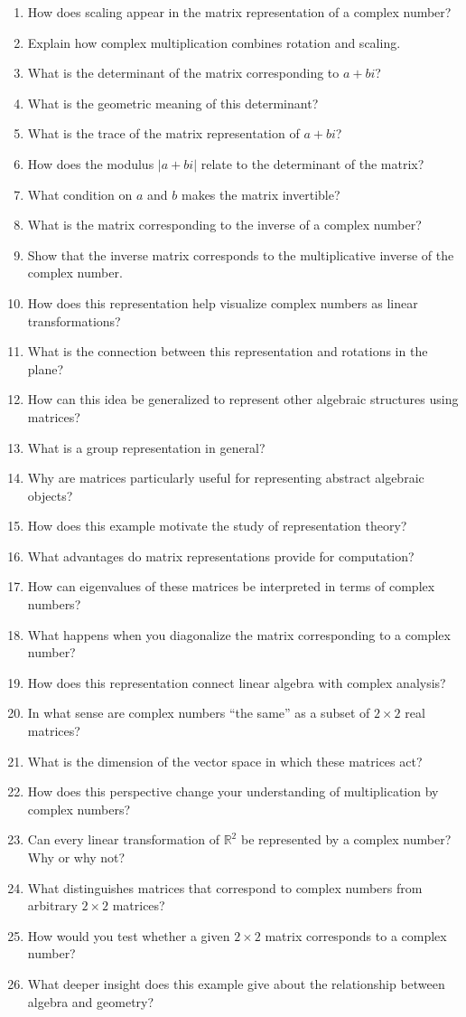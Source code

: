 \begin{enumerate}
  \item How does scaling appear in the matrix representation of a complex number?
  \item Explain how complex multiplication combines rotation and scaling.
  \item What is the determinant of the matrix corresponding to \(a + bi\)?
  \item What is the geometric meaning of this determinant?
  \item What is the trace of the matrix representation of \(a + bi\)?
  \item How does the modulus \(|a+bi|\) relate to the determinant of the matrix?
  \item What condition on \(a\) and \(b\) makes the matrix invertible?
  \item What is the matrix corresponding to the inverse of a complex number?
  \item Show that the inverse matrix corresponds to the multiplicative inverse of the complex number.
  \item How does this representation help visualize complex numbers as linear transformations?
  \item What is the connection between this representation and rotations in the plane?
  \item How can this idea be generalized to represent other algebraic structures using matrices?
  \item What is a group representation in general?
  \item Why are matrices particularly useful for representing abstract algebraic objects?
  \item How does this example motivate the study of representation theory?
  \item What advantages do matrix representations provide for computation?
  \item How can eigenvalues of these matrices be interpreted in terms of complex numbers?
  \item What happens when you diagonalize the matrix corresponding to a complex number?
  \item How does this representation connect linear algebra with complex analysis?
  \item In what sense are complex numbers ``the same'' as a subset of \(2 \times 2\) real matrices?
  \item What is the dimension of the vector space in which these matrices act?
  \item How does this perspective change your understanding of multiplication by complex numbers?
  \item Can every linear transformation of \(\mathbb{R}^{2}\) be represented by a complex number? Why or why not?
  \item What distinguishes matrices that correspond to complex numbers from arbitrary \(2 \times 2\) matrices?
  \item How would you test whether a given \(2 \times 2\) matrix corresponds to a complex number?
  \item What deeper insight does this example give about the relationship between algebra and geometry?
\end{enumerate}
